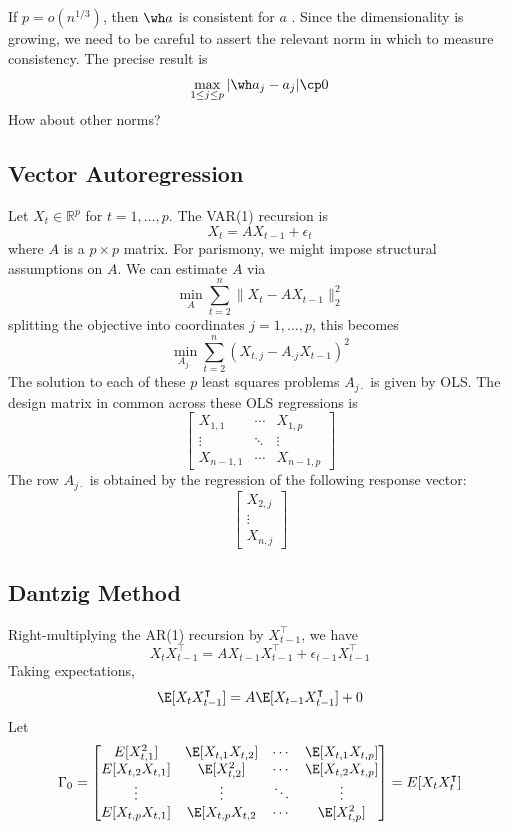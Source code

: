 If \(p = o(n^{1/3})\), then \(\wh a\) is consistent for \(a\) \citep{Ber74}. Since the dimensionality is growing, we need to be careful to assert the relevant norm in which to measure consistency. The precise result is
\[\max_{1 \leq j \leq p} |\wh a_j - a_j| \cp 0\]
How about other norms?

\subsection*{Vector Autoregression}
Let \(X_t \in \mathbb{R}^p\) for \(t = 1, \dots, p\). The VAR(1) recursion is
\[X_t = AX_{t-1} + \epsilon_t\]
where \(A\) is a \(p \times p\) matrix. For parismony, we might impose structural assumptions on \(A\). We can estimate \(A\) via
\[\min_A \sum_{t=2}^n \|X_t - AX_{t-1}\|_2^2\]
splitting the objective into coordinates \(j = 1, \dots, p\), this becomes
\[\min_{A_{j\cdot}} \sum_{t=2}^n (X_{t,j} - A_{\cdot j} X_{t-1})^2\]
The solution to each of these \(p\) least squares problems \(A_{j\cdot}\) is given by OLS. The design matrix in common across these OLS regressions is
\[\begin{bmatrix}
X_{1,1} & \cdots & X_{1,p} \\
\vdots & \ddots & \vdots \\
X_{n-1, 1} & \cdots & X_{n-1, p}
\end{bmatrix}\]
The row \(A_{j\cdot}\) is obtained by the regression of the following response vector:
\[\begin{bmatrix}
X_{2,j} \\
\vdots \\
X_{n,j}
\end{bmatrix}\]

\subsection*{Dantzig Method}
Right-multiplying the AR(1) recursion by \(X_{t-1}^\intercal\), we have
\[X_t X_{t-1}^\intercal = A X_{t-1} X_{t-1}^\intercal + \epsilon_{t-1} X_{t-1}^\intercal\]
Taking expectations,
\[\E[X_t X_{t-1}^\intercal] = A \E[X_{t-1}X_{t-1}^\intercal] + 0\]
Let
\[\Gamma_0 =
\begin{bmatrix}
E[X_{t,1}^2] & \E[X_{t,1}X_{t,2}] & \cdots & \E[X_{t,1}X_{t,p}] \\
E[X_{t,2}X_{t,1}] & \E[X_{t,2}^2] & \cdots & \E[X_{t,2}X_{t,p}] \\
\vdots & \vdots & \ddots & \vdots \\
E[X_{t,p}X_{t,1}] & \E[X_{t,p}X_{t,2} & \cdots & \E[X_{t,p}^2]
\end{bmatrix}
=
E[X_t X_t^\intercal]\]

